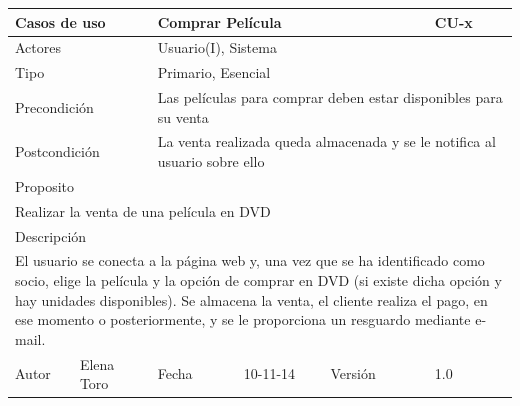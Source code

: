 \documentclass{article}
\begin{document}
\begin{table}[ht]
\begin{tabular}{|l|l|l|l|l|l|}
\hline
\multicolumn{2}{|p{2cm}|}{Casos de uso}  & \multicolumn{3}{p{7cm}|}{\textbf{Comprar Película}} & CU-x \\
\hline
\multicolumn{2}{|p{2cm}|}{Actores}       & \multicolumn{4}{p{8cm}|}{Usuario(I), Sistema}        \\
\hline
\multicolumn{2}{|p{2cm}|}{Tipo}          & \multicolumn{4}{p{8cm}|}{Primario, Esencial}        \\
\hline
\multicolumn{2}{|p{2cm}|}{Precondición}  & \multicolumn{4}{p{8cm}|}{Las películas para comprar deben estar disponibles para su venta}        \\
\hline
\multicolumn{2}{|p{2cm}|}{Postcondición} & \multicolumn{4}{p{8cm}|}{La venta realizada queda almacenada y se le notifica al usuario sobre ello}        \\
\hline
\multicolumn{6}{|p{10cm}|}{Proposito}                                   \\
\hline
\multicolumn{6}{|p{10cm}|}{Realizar la venta de una película en DVD}                                            \\
\hline
\multicolumn{6}{|p{10cm}|}{Descripción}                                 \\
\hline
\multicolumn{6}{|p{10cm}|}{El usuario se conecta a la página web y, una vez que se ha identificado como socio, elige la película y la opción de comprar en DVD (si existe dicha opción y hay unidades disponibles).
Se almacena la venta, el cliente realiza el pago, en ese momento o posteriormente, y se le proporciona un resguardo mediante e-mail.}                                            \\
\hline
Autor           &Elena Toro              & Fecha    &10-11-14     &   Versión  &1.0\\
\hline
\end{tabular}
\end{table}
\end{document}
